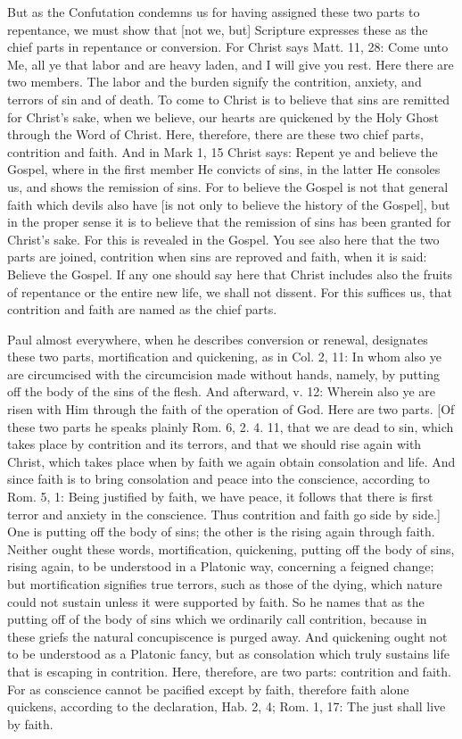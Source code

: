 But as the Confutation condemns us for having assigned these two
parts to repentance, we must show that [not we, but] Scripture
expresses these as the chief parts in repentance or conversion.  For
Christ says Matt. 11, 28: Come unto Me, all ye that labor and are
heavy laden, and I will give you rest.  Here there are two members.
The labor and the burden signify the contrition, anxiety, and terrors
of sin and of death.  To come to Christ is to believe that sins are
remitted for Christ's sake, when we believe, our hearts are quickened
by the Holy Ghost through the Word of Christ.  Here, therefore, there
are these two chief parts, contrition and faith.  And in Mark 1, 15
Christ says: Repent ye and believe the Gospel, where in the first
member He convicts of sins, in the latter He consoles us, and shows
the remission of sins.  For to believe the Gospel is not that general
faith which devils also have [is not only to believe the history of
the Gospel], but in the proper sense it is to believe that the
remission of sins has been granted for Christ's sake.  For this is
revealed in the Gospel.  You see also here that the two parts are
joined, contrition when sins are reproved and faith, when it is said:
Believe the Gospel.  If any one should say here that Christ includes
also the fruits of repentance or the entire new life, we shall not
dissent.  For this suffices us, that contrition and faith are named
as the chief parts.

Paul almost everywhere, when he describes conversion or renewal,
designates these two parts, mortification and quickening, as in Col.
2, 11: In whom also ye are circumcised with the circumcision made
without hands, namely, by putting off the body of the sins of the
flesh.  And afterward, v. 12: Wherein also ye are risen with Him
through the faith of the operation of God.  Here are two parts.  [Of
these two parts he speaks plainly Rom. 6, 2. 4. 11, that we are dead
to sin, which takes place by contrition and its terrors, and that we
should rise again with Christ, which takes place when by faith we
again obtain consolation and life.  And since faith is to bring
consolation and peace into the conscience, according to Rom. 5, 1:
Being justified by faith, we have peace, it follows that there is
first terror and anxiety in the conscience.  Thus contrition and
faith go side by side.] One is putting off the body of sins; the
other is the rising again through faith.  Neither ought these words,
mortification, quickening, putting off the body of sins, rising again,
to be understood in a Platonic way, concerning a feigned change; but
mortification signifies true terrors, such as those of the dying,
which nature could not sustain unless it were supported by faith.  So
he names that as the putting off of the body of sins which we
ordinarily call contrition, because in these griefs the natural
concupiscence is purged away.  And quickening ought not to be
understood as a Platonic fancy, but as consolation which truly
sustains life that is escaping in contrition.  Here, therefore, are
two parts: contrition and faith.  For as conscience cannot be
pacified except by faith, therefore faith alone quickens, according
to the declaration, Hab. 2, 4; Rom. 1, 17: The just shall live by
faith.

